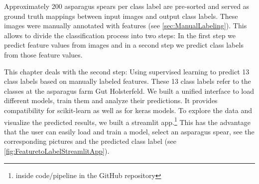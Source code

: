 Approximately 200 asparagus spears per class label are pre-sorted and served as ground truth mappings between input images and output class labels. These images were manually annotated with features (see \autoref{sec:ManualLabeling}). This allows to divide the classification process into two steps: In the first step we predict feature values from images and in a second step we predict class labels from those feature values.

\bigskip
This chapter deals with the second step: Using supervised learning to predict 13 class labels based on manually labeled features. These 13 class labels refer to the classes at the asparagus farm Gut Holsterfeld. We built a unified interface to load different models, train them and analyze their predictions. It provides compatibility for scikit-learn as well as for keras models. To explore the data and visualize the predicted results, we built a streamlit app.\footnote{inside code/pipeline in the GitHub repository} This has the advantage that the user can easily load and train a model, select an asparagus spear, see the corresponding pictures and the predicted class label (see \autoref{fig:FeaturetoLabelStreamlitApp}).

